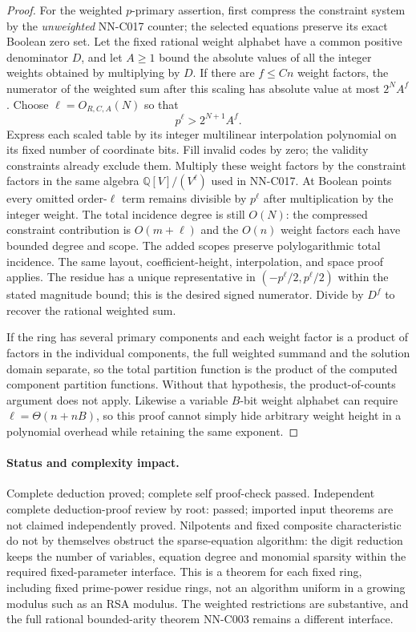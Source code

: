 \begin{proof}
For the weighted $p$-primary assertion, first compress the constraint system by the \emph{unweighted} NN-C017 counter; the selected equations preserve its exact Boolean zero set. Let the fixed rational weight alphabet have a common positive denominator $D$, and let $A\geq1$ bound the absolute values of all the integer weights obtained by multiplying by $D$. If there are $f\leq Cn$ weight factors, the numerator of the weighted sum after this scaling has absolute value at most $2^N A^f$. Choose $\ell=O_{R,C,A}(N)$ so that
\[
 p^\ell>2^{N+1}A^f.
\]
Express each scaled table by its integer multilinear interpolation polynomial on its fixed number of coordinate bits. Fill invalid codes by zero; the validity constraints already exclude them. Multiply these weight factors by the constraint factors in the same algebra $\mathbb Q[V]/(V^\ell)$ used in NN-C017. At Boolean points every omitted order-$\ell$ term remains divisible by $p^\ell$ after multiplication by the integer weight. The total incidence degree is still $O(N)$: the compressed constraint contribution is $O(m+\ell)$ and the $O(n)$ weight factors each have bounded degree and scope. The added scopes preserve polylogarithmic total incidence. The same layout, coefficient-height, interpolation, and space proof applies. The residue has a unique representative in $(-p^\ell/2,p^\ell/2)$ within the stated magnitude bound; this is the desired signed numerator. Divide by $D^f$ to recover the rational weighted sum.

If the ring has several primary components and each weight factor is a product of factors in the individual components, the full weighted summand and the solution domain separate, so the total partition function is the product of the computed component partition functions. Without that hypothesis, the product-of-counts argument does not apply. Likewise a variable $B$-bit weight alphabet can require $\ell=\Theta(n+nB)$, so this proof cannot simply hide arbitrary weight height in a polynomial overhead while retaining the same exponent.
\end{proof}
\paragraph{Status and complexity impact.}
Complete deduction proved; complete self proof-check passed. Independent complete deduction-proof review by root: passed; imported input theorems are not claimed independently proved. Nilpotents and fixed composite characteristic do not by themselves obstruct the sparse-equation algorithm: the digit reduction keeps the number of variables, equation degree and monomial sparsity within the required fixed-parameter interface. This is a theorem for each fixed ring, including fixed prime-power residue rings, not an algorithm uniform in a growing modulus such as an RSA modulus. The weighted restrictions are substantive, and the full rational bounded-arity theorem NN-C003 remains a different interface.

